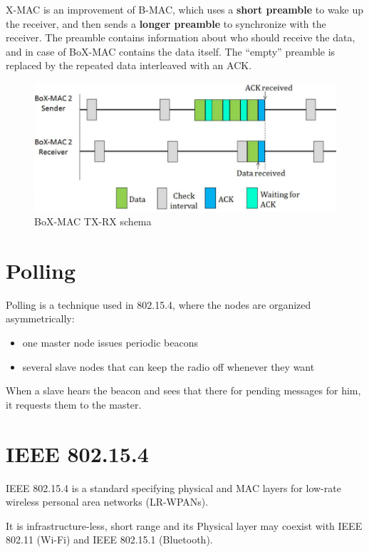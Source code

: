 X-MAC is an improvement of B-MAC, which uses a \textbf{short preamble} to wake up the receiver, and then sends a \textbf{longer preamble} to synchronize with the receiver.
The preamble contains information about who should receive the data, and in case of BoX-MAC contains the data itself. The ``empty'' preamble is replaced by the repeated data interleaved with an ACK.  

\begin{figure}[htbp]
   \centering
   \includegraphics{images/BoXmac.png}
   \caption{BoX-MAC TX-RX schema}
   \label{fig:BoXmac}
\end{figure}

\section{Polling}
Polling is a technique used in 802.15.4, where the nodes are organized asymmetrically:
\begin{itemize}
   \item one master node issues periodic beacons
   \item several slave nodes that can keep the radio off whenever they want
\end{itemize}
When a slave hears the beacon and sees that there for pending messages for him, it requests them to the master.

\section{IEEE 802.15.4}

IEEE 802.15.4 is a standard specifying physical and MAC layers for low-rate wireless personal area networks (LR-WPANs).

It is infrastructure-less, short range and its Physical layer may coexist with IEEE 802.11 (Wi-Fi) and IEEE 802.15.1 (Bluetooth). 

